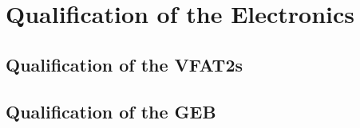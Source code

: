 \chapter{Qualification of the Electronics}
\label{chap:qualification}

    \section{Qualification of the VFAT2s}

    \section{Qualification of the GEB}
